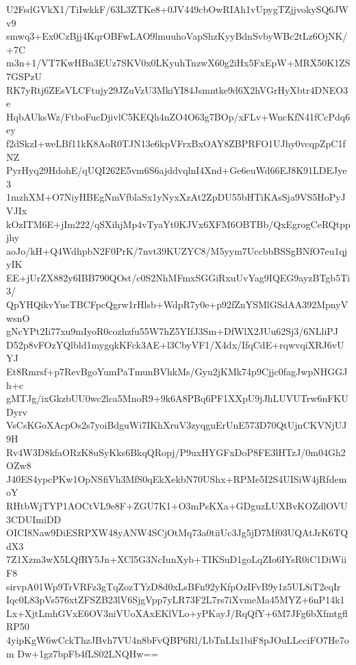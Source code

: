 U2FsdGVkX1/TiIwkkF/63L3ZTKe8+0JV449cbOwRIAh1vUpygTZjjvokySQ6JWv9
smwq3+Ex0CzBjj4KqrOBFwLAO9lmuuhoVapShzKyyBdnSvbyWBc2tLz6OjNK/+7C
m3n+1/VT7KwHBn3EUz7SKV0x0LKyuhTnzwX60g2iHx5FxEpW+MRX50K1ZS7GSPzU
RK7yRtj6ZEsVLCFtujy29JZuVzU3MkiYI84Jsmntke9d6X2hVGrHyXbtr4DNEO3e
HqbAUksWz/FtboFucDjivlC5KEQh4nZO4O63g7BOp/xFLv+WncKfN41fCcPdq6ey
f2dSkzI+weLBf11kK8AoR0TJN13e6kpVFrxBxOAY8ZBPRFO1UJhy0vcqpZpC1fNZ
PyrHyq29HdohE/qUQI262E5vm6S6ajddvqlnI4Xnd+Ge6euWd66EJ8K91LDEJye3
1mzhXM+O7NiyHBEgNmVfblaSx1yNyxXzAt2ZpDU55bHTiKAsSja9VS5HoPyJVJIx
kOzITM6E+jIm222/qSXihjMp4vTyaYt0KJVx6XFM6OBTBb/QxEgrogCeRQtppjhy
aoJo/kH+Q4WdhpbN2F0PrK/7nvt39KUZYC8/M5yym7UccbbBSSgBNfO7eu1qjyIK
EE+jUrZX882y6IBB790QOst/c0S2NhMFmxSGGiRxuUvYag9IQEG9ayzBTgb5Ti3/
QpYHQikvYueTBCFpcQgrw1rHlsb+WdpR7y0e+p92fZnYSMlGSdAA392MpnyVwsnO
gNcYPt2Ii77xu9mIyoR0cozhzfu55W7hZ5YIfJ3Sm+DfWlX2JUu62Sj3/6NLliPJ
D52p8vFOzYQlbld1mygqkKFck3AE+l3CbyVF1/X4dx/IfqCdE+rqwvqiXRJ6vUYJ
Et8Rmrsf+p7RevBgoYumPaTmunBVhkMs/Gyu2jKMk74p9Cjjc0fagJwpNHGGJh+c
gMTJg/ixGkzbUU0wc2lca5MnoR9+9k6A8PBq6PF1XXpU9jJhLUVUTrw6nFKUDyrv
VsCsKGoXAcpOs2s7yoiBdguWi7IKhXruV3zyqguErUnE573D70QtUjnCKVNjUJ9H
Rv4W3D8kfaORzK8uSyKks6BkqQRopj/P9uxHYGFxDoP8FE3lHTzJ/0m04Gh2OZw8
J40ES4ypcPKw1OpNSfiVh3MfS0qEkXekbN70UShx+RPMe5I2S4UISiW4jRfdemoY
RHtbWjTYP1AOCtVL9e8F+ZGU7K1+O3mPsKXa+GDguzLUXBvKOZdlOVU3CDUImiDD
OICI8Naw9DiESRPXW48yANW4SCjOtMq73a0tiiUc3Jg5jD7Mf03UQAtJrK6TQdX3
7Z1Xzm3wX5LQfRY5Jn+XCl5G3NcIunXyb+TIKSuD1goLqZIo6IYsR0iC1DiWiiF8
sirvpA01Wp9TrVRFz3gTqZozTYzD8d0xLsBFn92yKfpOzIFvB9y1z5UL8iT2eqIr
Iqc0L83pVs576xtZFSZB23lV6SjgVpp7yLR73F2L7rs7iXvmeMa45MYZ+6nP14k1
Lx+XjtLmhGVxE6OV3niVUoXAxEKlVLo+yPKayJ/RqQfY+6M7JFg6bXfmtgflRP50
4yipKgW6wCckThzJBvh7VU4n8bFvQBP6Rl/LbTnLIx1biF8pJOuLLeciFO7He7om
Dw+1gz7bpFb4fLS02LNQHw==
